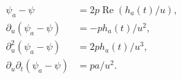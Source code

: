 \[
 \begin{aligned}
 \psi_a-\psi&=2p\operatorname{Re}(h_a(t)/u),\\
 \partial_u(\psi_a-\psi)&=-p h_a(t)/u^2,\\
 \partial_u^2(\psi_a-\psi)&=2p h_a(t)/u^3,\\
 \partial_u\partial_t(\psi_a-\psi)&=pa/u^2 .
 \end{aligned}
\]